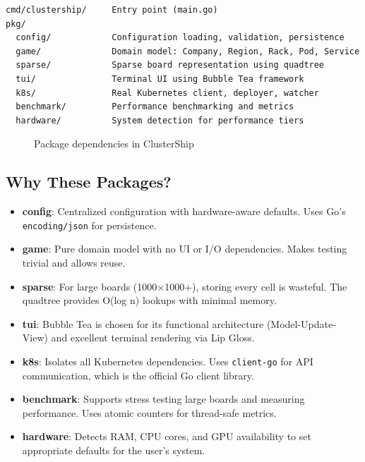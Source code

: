 \documentclass[11pt]{article}
\begin{document}
\begin{verbatim}
cmd/clustership/     Entry point (main.go)
pkg/
  config/            Configuration loading, validation, persistence
  game/              Domain model: Company, Region, Rack, Pod, Service
  sparse/            Sparse board representation using quadtree
  tui/               Terminal UI using Bubble Tea framework
  k8s/               Real Kubernetes client, deployer, watcher
  benchmark/         Performance benchmarking and metrics
  hardware/          System detection for performance tiers
\end{verbatim}

\begin{figure}[H]
    \centering
    \caption{Package dependencies in ClusterShip}
    \label{fig:packages}
\end{figure}

\subsection{Why These Packages?}

\begin{itemize}
    \item \textbf{config}: Centralized configuration with hardware-aware defaults. Uses Go's \texttt{encoding/json} for persistence.

    \item \textbf{game}: Pure domain model with no UI or I/O dependencies. Makes testing trivial and allows reuse.

    \item \textbf{sparse}: For large boards (1000$\times$1000+), storing every cell is wasteful. The quadtree provides O(log n) lookups with minimal memory.

    \item \textbf{tui}: Bubble Tea is chosen for its functional architecture (Model-Update-View) and excellent terminal rendering via Lip Gloss.

    \item \textbf{k8s}: Isolates all Kubernetes dependencies. Uses \texttt{client-go} for API communication, which is the official Go client library.

    \item \textbf{benchmark}: Supports stress testing large boards and measuring performance. Uses atomic counters for thread-safe metrics.

    \item \textbf{hardware}: Detects RAM, CPU cores, and GPU availability to set appropriate defaults for the user's system.
\end{itemize}
\end{document}

